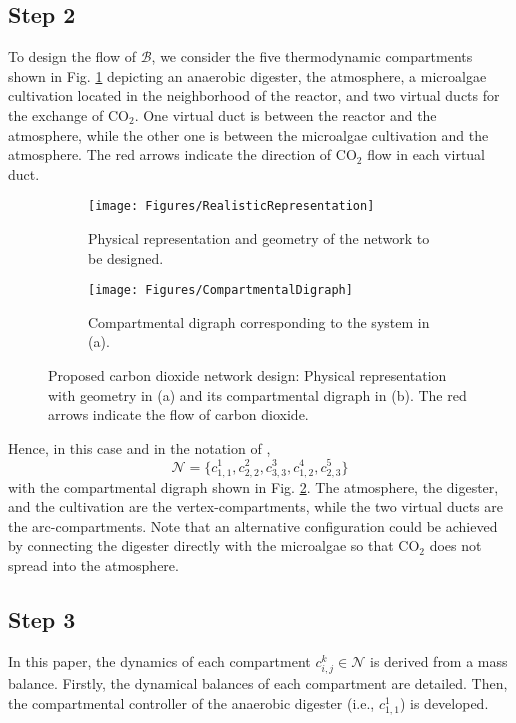 \documentclass[lettersize,journal]{IEEEtran}
\begin{document}
\subsection{Step 2} 
To design the flow of $\mathcal{B}$, we consider the five thermodynamic compartments shown in Fig. \ref{fig:RealisticRepresentation} depicting an anaerobic digester, the atmosphere, a microalgae cultivation located in the neighborhood of the reactor, and two virtual ducts for the exchange of $\text{CO}_2$. One virtual duct is between the reactor and the atmosphere, while the other one is between the microalgae cultivation and the atmosphere. The red arrows indicate the direction of $\text{CO}_2$ flow in each virtual duct.                        
\begin{figure}
\begin{subfigure}{0.5\textwidth}
\centering
\texttt{[image: Figures/RealisticRepresentation]}
\caption{Physical representation and geometry of the network to be designed.}
\label{fig:RealisticRepresentation}
\end{subfigure}
\begin{subfigure}{0.5\textwidth}
\centering
\texttt{[image: Figures/CompartmentalDigraph]}
\caption{Compartmental digraph corresponding to the system in (a).}
\label{fig:CompartmentalDigraph}
\end{subfigure}
\caption{Proposed carbon dioxide network design: Physical representation with geometry in (a) and its compartmental digraph in (b). The red arrows indicate the flow of carbon dioxide.}
\label{fig:TheNetwork}
\end{figure}

Hence, in this case and in the notation of \cite{zocco2023thermodynamical}, 
\begin{equation}
\mathcal{N} = \{c^1_{1,1}, c^2_{2,2}, c^3_{3,3}, c^4_{1,2}, c^5_{2,3}\} 
\end{equation}
with the compartmental digraph shown in Fig. \ref{fig:CompartmentalDigraph}. The atmosphere, the digester, and the cultivation are the vertex-compartments, while the two virtual ducts are the arc-compartments. Note that an alternative configuration could be achieved by connecting the digester directly with the microalgae so that $\text{CO}_2$ does not spread into the atmosphere.  








\subsection{Step 3} In this paper, the dynamics of each compartment $c^k_{i,j} \in \mathcal{N}$ is derived from a mass balance. Firstly, the dynamical balances of each compartment are detailed. Then, the compartmental controller of the anaerobic digester (i.e., $c^1_{1,1}$) is developed.  
\end{document}
